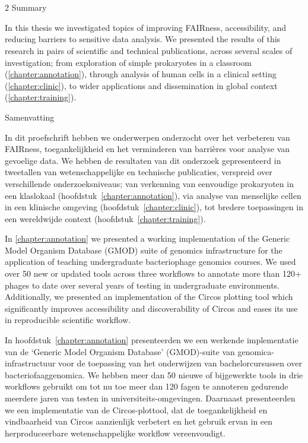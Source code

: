 \cleartorightpage
\setcounter{NAT@ctr}{-1}
\chapter{}\label{summary}

\begin{paracol}{2}%
{\huge Summary}

In this thesis we investigated topics of improving FAIRness, accessibility, and reducing barriers to sensitive data analysis.
We presented the results of this research in pairs of scientific and technical publications, across several scales of investigation; from exploration of simple prokaryotes in a classroom (\cref{chapter:annotation}), through analysis of human cells in a clinical setting (\cref{chapter:clinic}), to wider applications and dissemination in global context (\cref{chapter:training}).

\switchcolumn

{\huge Samenvatting}

In dit proefschrift hebben we onderwerpen onderzocht over het verbeteren van FAIRness, toegankelijkheid en het verminderen van barrières voor analyse van gevoelige data.
We hebben de resultaten van dit onderzoek gepresenteerd in tweetallen van wetenschappelijke en technische publicaties, verspreid over verschillende onderzoeksniveaus; van verkenning van eenvoudige prokaryoten in een klaslokaal (hoofdstuk~\ref{chapter:annotation}), via analyse van menselijke cellen in een klinische omgeving (hoofdstuk~\ref{chapter:clinic}), tot bredere toepassingen in een wereldwijde context (hoofdstuk~\ref{chapter:training}).

\switchcolumn*  %

In \cref{chapter:annotation} we presented a working implementation of the Generic Model Organism Database (GMOD) suite of genomics infrastructure for the application of teaching undergraduate bacteriophage genomics courses.
We used over 50 new or updated tools across three workflows to annotate more than 120+ phages to date over several years of testing in undergraduate environments.
Additionally, we presented an implementation of the Circos plotting tool which significantly improves accessibility and discoverability of Circos and eases its use in reproducible scientific workflow.

\switchcolumn

	In hoofdstuk~\ref{chapter:annotation} presenteerden we een werkende implementatie van de `Generic Model Organism Database' (GMOD)-suite van genomica-infrastructuur voor de toepassing van het onderwijzen van bachelorcursussen over bacteriofaaggenomica.
We hebben meer dan 50 nieuwe of bijgewerkte tools in drie workflows gebruikt om tot nu toe meer dan 120 fagen te annoteren gedurende meerdere jaren van testen in universiteits-omgevingen.
Daarnaast presenteerden we een implementatie van de Circos-plottool, dat de toegankelijkheid en vindbaarheid van Circos aanzienlijk verbetert en het gebruik ervan in een herproduceerbare wetenschappelijke workflow vereenvoudigt.


\end{paracol}
